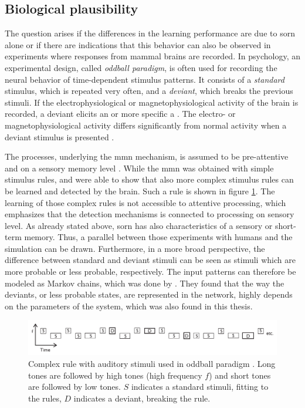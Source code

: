 \subsection{Biological plausibility}

The question arises if the differences in the learning performance are due to \acs{sorn} alone or if there are indications that this behavior can also be observed in experiments where responses from mammal brains are recorded. In psychology, an experimental design, called \emph{oddball paradigm}, is often used for recording the neural behavior of time-dependent stimulus patterns. It consists of a \emph{standard} stimulus, which is repeated very often, and a \emph{deviant}, which breaks the previous stimuli. If the electrophysiological or magnetophysiological activity of the brain is recorded, a deviant elicits an  or more specific a . The electro- or magnetophysiological activity differs significantly from normal activity when a deviant stimulus is presented \parencite{naatanen1978early}.

The processes, underlying the \acs{mmn} mechanism, is assumed to be pre-attentive and on a sensory memory level \parencite{tiitinen1994attentive}. While the \acs{mmn} was obtained with simple stimulus rules, \textcite{paavilainen2007preattentive} and \textcite{bendixen2008rapid} were able to show that also more complex stimulus rules can be learned and detected by the brain. Such a rule is shown in figure \ref{fig:oddball-rule}. The learning of those complex rules is not accessible to attentive processing, which emphasizes that the detection mechanisms is connected to processing on sensory level. As already stated above, \acs{sorn} has also characteristics of a sensory or short-term memory. Thus, a parallel between those experiments with humans and the simulation can be drawn. Furthermore, in a more broad perspective, the difference between standard and deviant stimuli can be seen as stimuli which are more probable or less probable, respectively. The input patterns can therefore be modeled as Markov chains, which was done by \textcite{mill2011neurocomputational}. They found that the way the deviants, or less probable states, are represented in the network, highly depends on the parameters of the system, which was also found in this thesis.

\begin{figure}[!t]
	\centering
	\includegraphics[width=\textwidth]{discussion/oddball-rule}
	\caption[Complex rule used in oddball paradigm]{Complex rule with auditory stimuli used in oddball paradigm \parencite[figure 1]{paavilainen2007preattentive}. Long tones are followed by high tones (high frequency $f$) and short tones are followed by low tones. $S$ indicates a standard stimuli, fitting to the rules, $D$ indicates a deviant, breaking the rule.}
	\label{fig:oddball-rule}
\end{figure}

